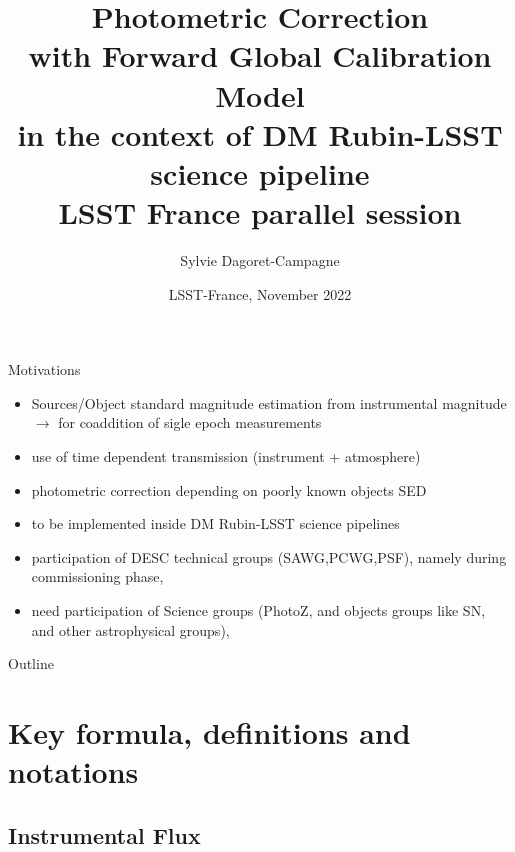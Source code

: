 \documentclass{beamer}
\title[Photometric Corrections with FGCM]{Photometric Correction \\
with Forward Global Calibration Model \\
in the context of DM Rubin-LSST science pipeline \\
{\small LSST France parallel session}}
\author[S. Dagoret-Campagne]{
Sylvie Dagoret-Campagne}
\institute[IJCLab]{
  IJCLab,
  CNRS/IN2P3 \& Université Paris-Saclay,
  Orsay, France \\ \today  }
\date[LPNHE, November 29th 2022]{LSST-France, November 2022}
\begin{document}
\begin{frame}
  \titlepage
\end{frame}

\begin{frame}{Motivations}
\begin{itemize}
\item Sources/Object standard magnitude estimation from instrumental magnitude $\rightarrow$ for coaddition of sigle epoch measurements
\item use of time dependent transmission (instrument + atmosphere)
\item photometric correction depending on poorly known objects SED
\item to be implemented inside DM Rubin-LSST science pipelines 
\item participation of DESC technical groups (SAWG,PCWG,PSF), namely during commissioning phase,
\item need participation of Science groups (PhotoZ, and objects groups like SN, and other astrophysical groups),
\end{itemize}
\end{frame}

\begin{frame}{Outline}
  \tableofcontents
\end{frame}




\section{Key formula, definitions and notations}
\subsection{Instrumental Flux}
\end{document}
